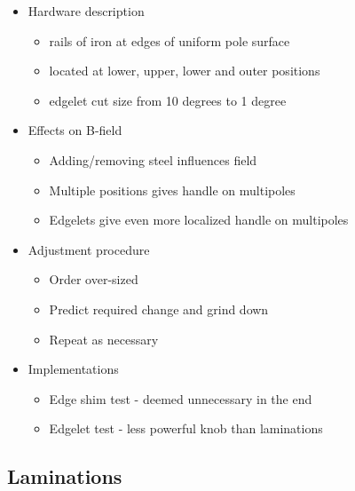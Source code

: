 \begin{itemize}
  \item Hardware description
    \begin{itemize}
      \item rails of iron at edges of uniform pole surface
      \item located at lower, upper, lower and outer positions
      \item edgelet cut size from 10 degrees to 1 degree
    \end{itemize}
  \item Effects on B-field
    \begin{itemize}
      \item Adding/removing steel influences field
      \item Multiple positions gives handle on multipoles
      \item Edgelets give even more localized handle on multipoles
    \end{itemize}
  \item Adjustment procedure
    \begin{itemize}
      \item Order over-sized
      \item Predict required change and grind down
      \item Repeat as necessary
    \end{itemize}
  \item Implementations
    \begin{itemize}
      \item Edge shim test - deemed unnecessary in the end
      \item Edgelet test - less powerful knob than laminations
    \end{itemize}
\end{itemize}


\subsection{Laminations}


